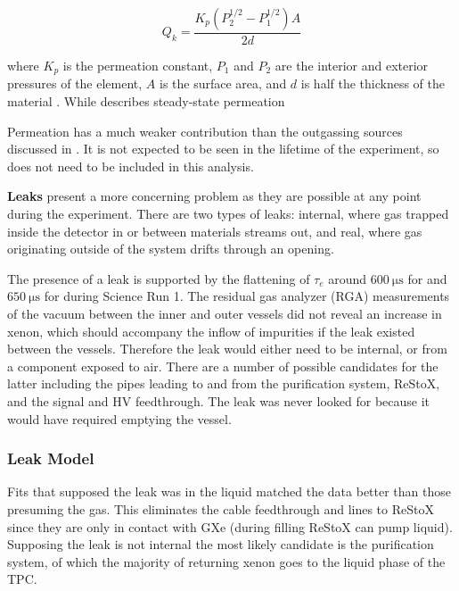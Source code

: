 \vspace{-10pt}

\begin{equation}
Q_k = \frac{K_p (P_2^{1/2} - P_1^{1/2})A}{2d}
\label{eq:electron_lifetime_model_outgassing_leak_sources_perm}
\end{equation}

\noindent where $K_p$ is the permeation constant, $P_1$ and $P_2$ are the interior and exterior pressures of the element, $A$ is the
surface area, and
$d$ is half the thickness of the material .  While 
describes steady-state permeation 

Permeation has a much weaker contribution than the outgassing sources discussed in
.  It is not expected to be seen in the lifetime of the
experiment, so does not need to be included in this analysis.

\textbf{Leaks} present a more concerning problem as they are possible at any point during the experiment.  There are two types of leaks:
internal, where gas trapped inside the detector
in or between materials streams out, and real, where gas originating outside of the system drifts through an opening.

The presence of a leak is supported by the flattening of $\tau_e$ around $600\ \mathrm{\mu s}$ for \alphadecays and
$650\ \mathrm{\mu s}$ for \metakr during Science Run 1.  The residual gas analyzer (RGA) measurements of the vacuum between the inner and
outer vessels did not reveal an increase in xenon, which should accompany the inflow of impurities if the leak existed
between the vessels.  Therefore the
leak would either need to be internal, or from a component exposed to air.  There are a number of possible candidates for the
latter including the pipes leading to and from the purification system, ReStoX, and the signal and HV feedthrough.  The leak was never
looked for because it would have required emptying the vessel.



\subsubsection{Leak Model}
\label{subsubsec:electron_lifetime_model_outgassing_leak_model}
Fits that supposed the leak was in the liquid matched the data better than those presuming the gas.  This eliminates the cable feedthrough
and lines to ReStoX since they are only in contact with GXe (during filling ReStoX can pump liquid).  Supposing the leak is
not internal the most likely candidate is the purification system, of which the majority of returning xenon goes to the liquid phase of the
TPC.

